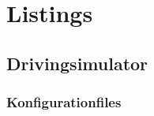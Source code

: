 \section{Listings}

\subsection{Drivingsimulator}
\subsubsection{Konfigurationfiles}

\label{listing:plugins.cfg}


\label{listing:graphics.cfg}


\label{listing:resources.cfg}


